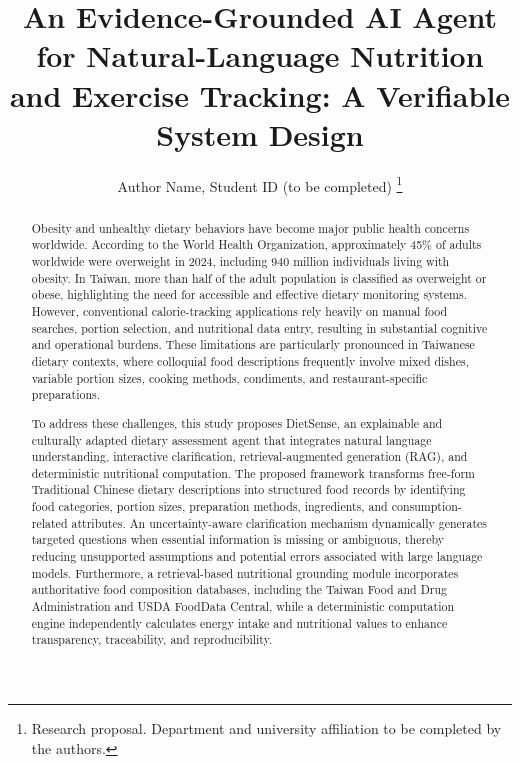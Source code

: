 \documentclass[journal,10pt]{IEEEtran}
\begin{document}
\title{An Evidence-Grounded AI Agent for Natural-Language Nutrition and Exercise Tracking: A Verifiable System Design}
\author{Author Name, Student ID (to be completed)%
\thanks{Research proposal. Department and university affiliation to be completed by the authors.}}
\maketitle
\begin{abstract}
Obesity and unhealthy dietary behaviors have become major public health concerns worldwide. According to the World Health Organization, approximately 45\% of adults worldwide were overweight in 2024, including 940 million individuals living with obesity. In Taiwan, more than half of the adult population is classified as overweight or obese, highlighting the need for accessible and effective dietary monitoring systems. However, conventional calorie-tracking applications rely heavily on manual food searches, portion selection, and nutritional data entry, resulting in substantial cognitive and operational burdens. These limitations are particularly pronounced in Taiwanese dietary contexts, where colloquial food descriptions frequently involve mixed dishes, variable portion sizes, cooking methods, condiments, and restaurant-specific preparations.

To address these challenges, this study proposes DietSense, an explainable and culturally adapted dietary assessment agent that integrates natural language understanding, interactive clarification, retrieval-augmented generation (RAG), and deterministic nutritional computation. The proposed framework transforms free-form Traditional Chinese dietary descriptions into structured food records by identifying food categories, portion sizes, preparation methods, ingredients, and consumption-related attributes. An uncertainty-aware clarification mechanism dynamically generates targeted questions when essential information is missing or ambiguous, thereby reducing unsupported assumptions and potential errors associated with large language models. Furthermore, a retrieval-based nutritional grounding module incorporates authoritative food composition databases, including the Taiwan Food and Drug Administration and USDA FoodData Central, while a deterministic computation engine independently calculates energy intake and nutritional values to enhance transparency, traceability, and reproducibility.


\end{abstract}
\end{document}
